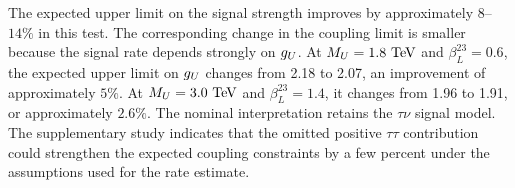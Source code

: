 The expected upper limit on the signal strength improves by approximately $8$--$14\%$ in this test.
The corresponding change in the coupling limit is smaller because the signal rate depends strongly on $g_U$.
At $M_U=1.8~\mathrm{TeV}$ and $\beta_L^{23}=0.6$, the expected upper limit on $g_U$ changes from 2.18 to 2.07, an improvement of approximately $5\%$.
At $M_U=3.0~\mathrm{TeV}$ and $\beta_L^{23}=1.4$, it changes from 1.96 to 1.91, or approximately $2.6\%$.
The nominal interpretation retains the $\tau\nu$ signal model.
The supplementary study indicates that the omitted positive $\tau\tau$ contribution could strengthen the expected coupling constraints by a few percent under the assumptions used for the rate estimate.
